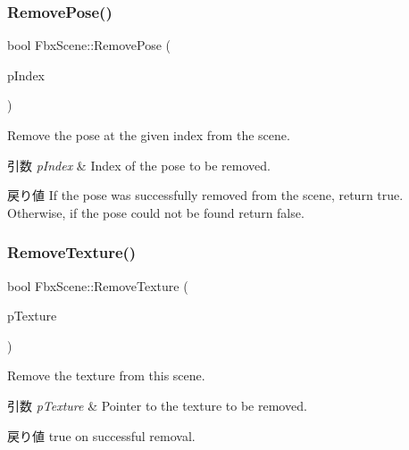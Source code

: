 \subsubsection{\texorpdfstring{Remove\+Pose()}{RemovePose()}\hspace{0.1cm}{\footnotesize\ttfamily [2/2]}}
{\footnotesize\ttfamily bool Fbx\+Scene\+::\+Remove\+Pose (\begin{DoxyParamCaption}\item[{int}]{p\+Index }\end{DoxyParamCaption})}

Remove the pose at the given index from the scene. 
\begin{DoxyParams}{引数}
{\em p\+Index} & Index of the pose to be removed. \\
\hline
\end{DoxyParams}
\begin{DoxyReturn}{戻り値}
If the pose was successfully removed from the scene, return {\ttfamily true}. Otherwise, if the pose could not be found return {\ttfamily false}. 
\end{DoxyReturn}
\mbox{\label{class_fbx_scene_af802f5395ba0fcb72f13f2734ad17332}} 
\subsubsection{\texorpdfstring{Remove\+Texture()}{RemoveTexture()}}
{\footnotesize\ttfamily bool Fbx\+Scene\+::\+Remove\+Texture (\begin{DoxyParamCaption}\item[{\hyperlink{class_fbx_texture}{Fbx\+Texture} $\ast$}]{p\+Texture }\end{DoxyParamCaption})}

Remove the texture from this scene. 
\begin{DoxyParams}{引数}
{\em p\+Texture} & Pointer to the texture to be removed. \\
\hline
\end{DoxyParams}
\begin{DoxyReturn}{戻り値}
{\ttfamily true} on successful removal. 
\end{DoxyReturn}
\mbox{\label{class_fbx_scene_aac60d3534072390ae951879dd92339ff}} 
